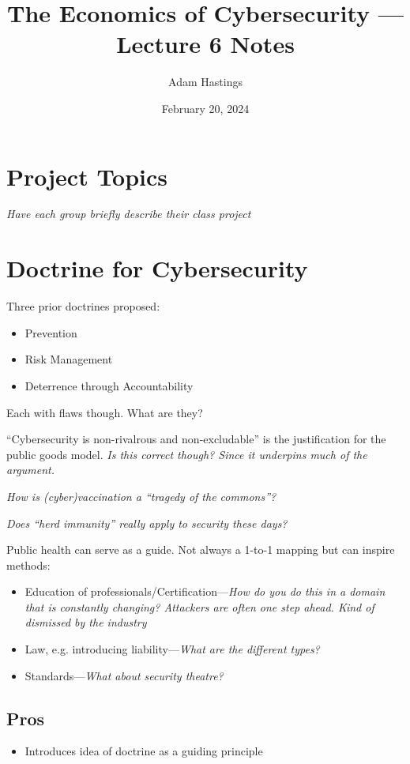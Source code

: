 \documentclass[11pt]{article}
\title{The Economics of Cybersecurity --- Lecture 6 Notes}
\date{February 20, 2024}
\author{Adam Hastings}
\begin{document}
\maketitle

\section*{Project Topics}

\textit{Have each group briefly describe their class project}

\section*{Doctrine for Cybersecurity}

Three prior doctrines proposed:
\begin{itemize}
    \item Prevention
    \item Risk Management 
    \item Deterrence through Accountability
\end{itemize}

Each with flaws though. What are they?

``Cybersecurity is non-rivalrous and non-excludable'' is the justification for the public goods model. {\it Is this correct though? Since it underpins much of the argument.}

{\it How is (cyber)vaccination a ``tragedy of the commons''?}

{\it Does ``herd immunity'' really apply to security these days?}

Public health can serve as a guide. Not always a 1-to-1 mapping but can inspire methods:
\begin{itemize}
    \item Education of professionals/Certification---{\it How do you do this in a domain that is constantly changing? Attackers are often one step ahead. Kind of dismissed by the industry}
    \item Law, e.g. introducing liability---{\it What are the different types?}
    \item Standards---{\it What about security theatre?}
\end{itemize}


\subsection{Pros}
\begin{itemize}
    \item Introduces idea of doctrine as a guiding principle
\end{itemize}
\end{document}
